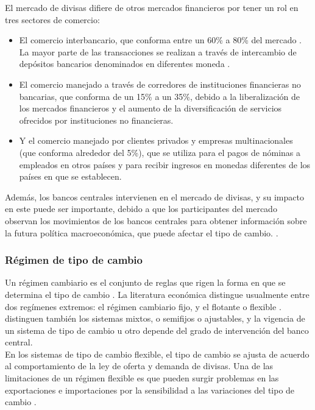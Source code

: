 	El mercado de divisas difiere de otros mercados financieros por tener un rol en tres sectores de comercio:
	\begin{itemize}
		\item El comercio interbancario, que conforma entre un 60\% a 80\% del mercado \parencite{exchecon}. La mayor parte de las transacciones se realizan a través de intercambio de depósitos bancarios denominados en diferentes moneda \parencite{intecon}.
		
		\item El comercio manejado a través de corredores de instituciones financieras no bancarias, que conforma de un 15\% a un 35\%, debido a la liberalización de los mercados financieros y el aumento de la diversificación de servicios ofrecidos por instituciones no financieras. \parencite{exchecon,intecon}
		
		\item Y el comercio manejado por clientes privados y empresas multinacionales (que conforma alrededor del 5\%), que se utiliza para el pagos de nóminas a empleados en otros países y para recibir ingresos en monedas diferentes de los países en que se establecen. \parencite{exchecon,intecon}
	\end{itemize}
	
	Además, los bancos centrales intervienen en el mercado de divisas, y su impacto en este puede ser importante, debido a que los participantes del mercado observan los movimientos de los bancos centrales para obtener información sobre la futura política macroeconómica, que puede afectar el tipo de cambio. \parencite{intecon}.
		
	\subsubsection{Régimen de tipo de cambio}
	Un régimen cambiario es el conjunto de reglas que rigen la forma en que se determina el tipo de cambio \parencite{banguatregime}. La literatura económica distingue usualmente entre dos regímenes extremos: el régimen cambiario fijo, y el flotante o flexible  \parencite{exchecon}. \textcite{mochon} distinguen también los sistemas mixtos, o semifijos o ajustables, y la vigencia de un sistema de tipo de cambio u otro depende del grado de intervención del banco central.\\
	
	En los sistemas de tipo de cambio flexible, el tipo de cambio se ajusta de acuerdo al comportamiento de la ley de oferta y demanda de divisas. Una de las limitaciones de un régimen flexible es que pueden surgir problemas en las exportaciones e importaciones por la sensibilidad a las variaciones del tipo de cambio \parencite{mochon}.\\
	
